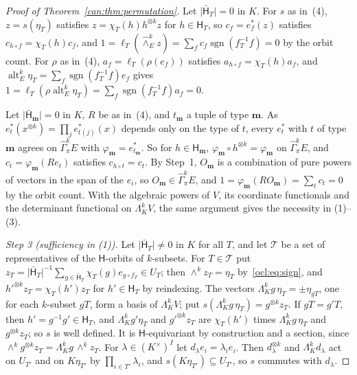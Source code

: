 \documentclass[11pt]{amsart}
\theoremstyle{definition}
\theoremstyle{remark}
\numberwithin{equation}{section}
\newcommand{\sgn}{\operatorname{sgn}}
\newcommand{\abs}[1]{\lvert #1\rvert}
\theoremstyle{plain}
\theoremstyle{definition}
\theoremstyle{plain}
\newcommand{\alt}{\operatorname{alt}}
\begin{document}
\begin{proof}[Proof of Theorem~\ref{can:thm:permutation}]
Let $\abs{\bar{\mathsf H}_T}=0$ in $K$. For $s$ as in~(4), $z=s(\eta_T)$ satisfies $z=\chi_T(h)h^{\otimes k}z$ for
$h\in\mathsf H_T$, so $c_f=e^*_f(z)$ satisfies $c_{h\circ f}=\chi_T(h)c_f$, and
$1=\ell_T(\widehat\wedge^k_Ez)=\sum_fc_f\sgn(f_T^{-1}f)=0$ by the orbit count. For $\rho$ as in~(4),
$a_f=\ell_T(\rho(e_f))$ satisfies $a_{h\circ f}=\chi_T(h)a_f$, and $\alt^k_E\eta_T=\sum_f\sgn(f_T^{-1}f)e_f$ gives
$1=\ell_T(\rho\alt^k_E\eta_T)=\sum_f\sgn(f_T^{-1}f)a_f=0$.

Let $\abs{\bar{\mathsf H}_{\mathbf m}}=0$ in $K$, $R$ be as in~(4), and $t_{\mathbf m}$ a tuple of type $\mathbf m$. As
$e^*_t(x^{\otimes k})=\prod_je^*_{t(j)}(x)$ depends only on the type of $t$, every $e^*_t$ with $t$ of type $\mathbf m$
agrees on $\widehat\Gamma^k_\pi E$ with $\varphi_{\mathbf m}=e^*_{t_{\mathbf m}}$. So for $h\in\mathsf H_{\mathbf m}$,
$\varphi_{\mathbf m}\circ h^{\otimes k}=\varphi_{\mathbf m}$ on $\widehat\Gamma^k_\pi E$, and $c_t=\varphi_{\mathbf
m}(Re_t)$ satisfies $c_{h\circ t}=c_t$. By Step~1, $O_{\mathbf m}$ is a combination of pure powers
of vectors in the span of the $e_i$, so $O_{\mathbf m}\in\widehat\Gamma^k_\pi E$, and $1=\varphi_{\mathbf m}(RO_{\mathbf
m})=\sum_tc_t=0$ by the orbit count. With the algebraic powers of $V$, its coordinate functionals and the determinant
functional on $\Lambda^k_KV$, the same argument gives the necessity in (1)--(3).

\emph{Step 3 (sufficiency in (1)).} Let $\abs{\bar{\mathsf H}_T}\ne0$ in $K$ for all $T$, and let $\mathcal T$ be a
set of representatives of the $\mathsf H$-orbits of $k$-subsets. For $T\in\mathcal T$ put $z_T=\abs{\bar{\mathsf
H}_T}^{-1}\sum_{g\in\bar{\mathsf H}_T}\chi_T(g)e_{g\circ f_T}\in U_T$; then $\wedge^kz_T=\eta_T$ by~\eqref{ocl:eq:sign},
and $h'^{\otimes k}z_T=\chi_T(h')z_T$ for $h'\in\mathsf H_T$ by reindexing. The vectors
$\Lambda^k_Kg\,\eta_T=\pm\eta_{gT}$, one for each $k$-subset $gT$, form a basis of $\Lambda^k_KV$; put
$s(\Lambda^k_Kg\,\eta_T)=g^{\otimes k}z_T$. If $gT=g'T$, then $h'=g^{-1}g'\in\mathsf H_T$, and $\Lambda^k_Kg'\eta_T$ and
$g'^{\otimes k}z_T$ are $\chi_T(h')$ times $\Lambda^k_Kg\,\eta_T$ and $g^{\otimes k}z_T$; so $s$ is well defined. It is
$\mathsf H$-equivariant by construction and a section, since $\wedge^kg^{\otimes k}z_T=\Lambda^k_Kg\,\wedge^kz_T$. For
$\lambda\in(K^\times)^I$ let $d_\lambda e_i=\lambda_ie_i$. Then $d_\lambda^{\otimes k}$ and $\Lambda^k_Kd_\lambda$ act
on $U_{T'}$ and on $K\eta_{T'}$ by $\prod_{i\in T'}\lambda_i$, and $s(K\eta_{T'})\subseteq U_{T'}$, so $s$ commutes with
$d_\lambda$.


\end{proof}
\end{document}

